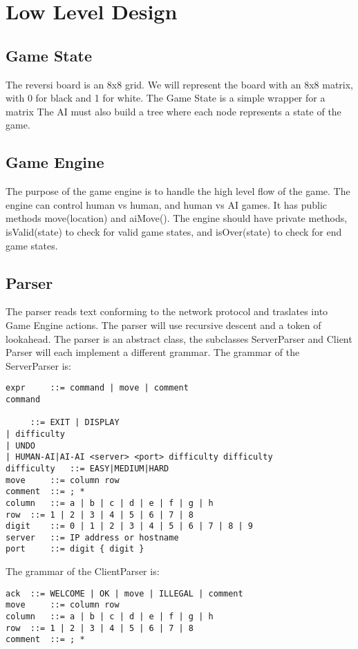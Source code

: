 \documentclass{article}
\begin{document}
\section{Low Level Design}

\subsection{Game State}
The reversi board is an 8x8 grid. We will represent the board with an 8x8 matrix, 
with 0 for black and 1 for white. The Game State is a simple wrapper for a matrix
The AI must also build a tree where each node represents a state of the game.    

\subsection{Game Engine}
The purpose of the game engine is to handle the high level flow of the game. The engine
can control human vs human, and human vs AI games. It has public methods move(location) and aiMove().
The engine should have private methods, isValid(state) to check for valid game states, and isOver(state)
to check for end game states. 

\subsection{Parser}
The parser reads text conforming to the network protocol and traslates into Game Engine actions.
The parser will use recursive descent and a token of lookahead. The parser is an abstract class,
the subclasses ServerParser and Client Parser will each implement a different grammar. 
The grammar of the ServerParser is:
\begin{verbatim}
expr     ::= command | move | comment
command 
  
 	 ::= EXIT | DISPLAY 
| difficulty 
| UNDO 
| HUMAN-AI|AI-AI <server> <port> difficulty difficulty
difficulty	 ::= EASY|MEDIUM|HARD
move	 ::= column row
comment	 ::= ; *
column	 ::= a | b | c | d | e | f | g | h
row	 ::= 1 | 2 | 3 | 4 | 5 | 6 | 7 | 8
digit	 ::= 0 | 1 | 2 | 3 | 4 | 5 | 6 | 7 | 8 | 9
server	 ::= IP address or hostname
port	 ::= digit { digit }
\end{verbatim}

\vspace{10 mm}
The grammar of the ClientParser is:
\begin{verbatim}
ack	 ::= WELCOME | OK | move | ILLEGAL | comment
move	 ::= column row
column	 ::= a | b | c | d | e | f | g | h
row	 ::= 1 | 2 | 3 | 4 | 5 | 6 | 7 | 8
comment	 ::= ; *
\end{verbatim}
\end{document}
